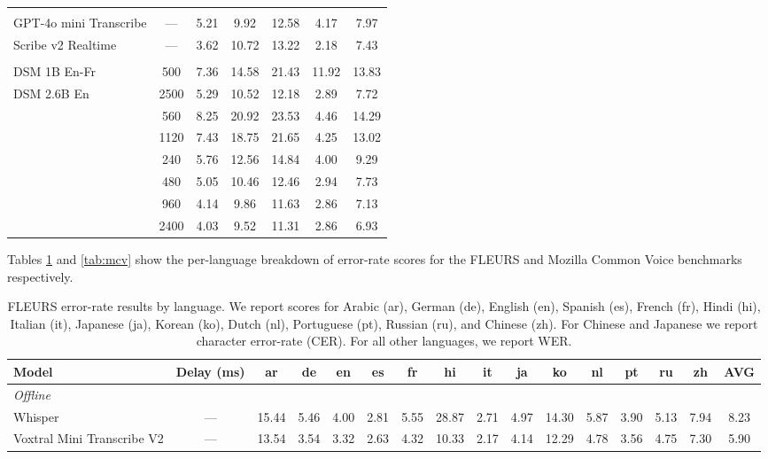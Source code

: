 \begin{landscape}
\begin{table}[h]
\begin{tabular}{lcccccc}
\addlinespace[0.6em]
\multicolumn{7}{l}{\textit{Realtime API}} \\
\cmidrule(lr){1-7}
GPT-4o mini Transcribe & — & 5.21 & 9.92 & 12.58 & 4.17 & 7.97 \\
Scribe v2 Realtime & — & 3.62 & 10.72 & 13.22 & 2.18 & 7.43 \\

\addlinespace[0.6em]
\multicolumn{7}{l}{\textit{Realtime Open-Source}} \\
\cmidrule(lr){1-7}
DSM 1B En-Fr & 500 & 7.36 & 14.58 & 21.43 & 11.92 & 13.83 \\
DSM 2.6B En & 2500 & 5.29 & 10.52 & 12.18 & 2.89 & 7.72 \\
\addlinespace
\multirow[t]{2}{*}{Nemotron Streaming} & 560 & 8.25 & 20.92 & 23.53 & 4.46 & 14.29 \\
 & 1120 & 7.43 & 18.75 & 21.65 & 4.25 & 13.02 \\
\addlinespace
\multirow[t]{4}{*}{Voxtral Realtime} & 240 & 5.76 & 12.56 & 14.84 & 4.00 & 9.29 \\
 & 480 & 5.05 & 10.46 & 12.46 & 2.94 & 7.73 \\
 & 960 & 4.14 & 9.86 & 11.63 & 2.86 & 7.13 \\
 & 2400 & 4.03 & 9.52 & 11.31 & 2.86 & 6.93 \\
\bottomrule
\end{tabular}
\end{table}


Tables \ref{tab:fleurs} and \ref{tab:mcv} show the per-language breakdown of error-rate scores for the FLEURS and Mozilla Common Voice benchmarks respectively.

\begin{table}[h]
\centering
\caption{FLEURS error-rate results by language. We report scores for Arabic (ar), German (de), English (en), Spanish (es), French (fr), Hindi (hi), Italian (it), Japanese (ja), Korean (ko), Dutch (nl), Portuguese (pt), Russian (ru), and Chinese (zh). For Chinese and Japanese we report character error-rate (CER). For all other languages, we report WER.}
\label{tab:fleurs}
\small
\begin{tabular}{lccccccccccccccc}
\toprule
\textbf{Model} & \textbf{Delay (ms)} & \textbf{ar} & \textbf{de} & \textbf{en} & \textbf{es} & \textbf{fr} & \textbf{hi} & \textbf{it} & \textbf{ja} & \textbf{ko} & \textbf{nl} & \textbf{pt} & \textbf{ru} & \textbf{zh} & \textbf{AVG} \\
\midrule

\multicolumn{16}{l}{\textit{Offline}} \\
\cmidrule(lr){1-16}
Whisper & — & 15.44 & 5.46 & 4.00 & 2.81 & 5.55 & 28.87 & 2.71 & 4.97 & 14.30 & 5.87 & 3.90 & 5.13 & 7.94 & 8.23 \\
Voxtral Mini Transcribe V2 & — & 13.54 & 3.54 & 3.32 & 2.63 & 4.32 & 10.33 & 2.17 & 4.14 & 12.29 & 4.78 & 3.56 & 4.75 & 7.30 & 5.90 \\


\end{tabular}
\end{table}
\end{landscape}
